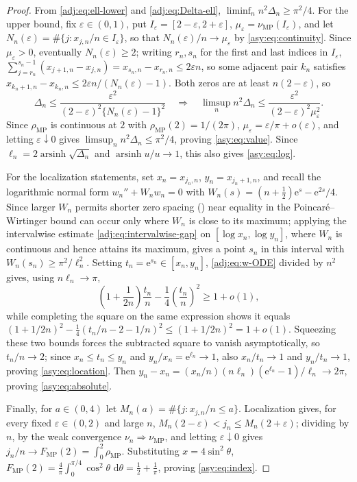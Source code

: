 \documentclass[11pt]{article}
\numberwithin{equation}{section}
\theoremstyle{definition}
\theoremstyle{remark}
\newcommand{\dd}{\,\mathrm d}
\newcommand{\e}{\mathrm e}
\newcommand{\MP}{\mathrm{MP}}
\begin{document}
\begin{proof}
From \eqref{adj:eq:ell-lower} and \eqref{adj:eq:Delta-ell}, $\liminf_n n^2\Delta_n\ge\pi^2/4$. For the upper bound, fix $\varepsilon\in(0,1)$, put $I_\varepsilon=[2-\varepsilon,2+\varepsilon]$, $\mu_\varepsilon=\nu_{\MP}(I_\varepsilon)$, and let $N_n(\varepsilon)=\#\{j:x_{j,n}/n\in I_\varepsilon\}$, so that $N_n(\varepsilon)/n\to\mu_\varepsilon$ by \eqref{asy:eq:continuity}. Since $\mu_\varepsilon>0$, eventually $N_n(\varepsilon)\ge2$; writing $r_n,s_n$ for the first and last indices in $I_\varepsilon$, $\sum_{j=r_n}^{s_n-1}(x_{j+1,n}-x_{j,n})=x_{s_n,n}-x_{r_n,n}\le2\varepsilon n$, so some adjacent pair $k_n$ satisfies $x_{k_n+1,n}-x_{k_n,n}\le2\varepsilon n/(N_n(\varepsilon)-1)$. Both zeros are at least $n(2-\varepsilon)$, so
\[
 \Delta_n
 \le
 \frac{\varepsilon^2}
 {(2-\varepsilon)^2\{N_n(\varepsilon)-1\}^2}
 \quad\Longrightarrow\quad
 \limsup_n n^2\Delta_n
 \le
 \frac{\varepsilon^2}{(2-\varepsilon)^2\mu_\varepsilon^2}.
\]
Since $\rho_{\MP}$ is continuous at $2$ with $\rho_{\MP}(2)=1/(2\pi)$, $\mu_\varepsilon=\varepsilon/\pi+o(\varepsilon)$, and letting $\varepsilon\downarrow0$ gives $\limsup_n n^2\Delta_n\le\pi^2/4$, proving \eqref{asy:eq:value}. Since $\ell_n=2\operatorname{arsinh}\sqrt{\Delta_n}$ and $\operatorname{arsinh}u/u\to1$, this also gives \eqref{asy:eq:log}.

For the localization statements, set $x_n=x_{j_n,n}$, $y_n=x_{j_n+1,n}$, and recall the logarithmic normal form $w_n''+W_nw_n=0$ with $W_n(s)=(n+\tfrac12)\e^s-\e^{2s}/4$. Since larger $W_n$ permits shorter zero spacing 
()
near equality in the Poincar\'e--Wirtinger bound can occur only where $W_n$ is close to its maximum; applying the intervalwise estimate \eqref{adj:eq:intervalwise-gap} on $[\log x_n,\log y_n]$, where $W_n$ is continuous and hence attains its maximum, gives a point $s_n$ in this interval with $W_n(s_n)\ge\pi^2/\ell_n^2$. Setting $t_n=\e^{s_n}\in[x_n,y_n]$, \eqref{adj:eq:w-ODE} divided by $n^2$ gives, using $n\ell_n\to\pi$,
\[
 \left(1+\frac1{2n}\right)\frac{t_n}{n}
 -
 \frac14\left(\frac{t_n}{n}\right)^2
 \ge1+o(1),
\]
while completing the square on the same expression shows it equals $(1+1/2n)^2-\tfrac14(t_n/n-2-1/n)^2\le(1+1/2n)^2=1+o(1)$. Squeezing these two bounds forces the subtracted square to vanish asymptotically, so $t_n/n\to2$; since $x_n\le t_n\le y_n$ and $y_n/x_n=\e^{\ell_n}\to1$, also $x_n/t_n\to1$ and $y_n/t_n\to1$, proving \eqref{asy:eq:location}. Then $y_n-x_n=(x_n/n)(n\ell_n)(\e^{\ell_n}-1)/\ell_n\to2\pi$, proving \eqref{asy:eq:absolute}.

Finally, for $a\in(0,4)$ let $M_n(a)=\#\{j:x_{j,n}/n\le a\}$. Localization gives, for every fixed $\varepsilon\in(0,2)$ and large $n$, $M_n(2-\varepsilon)<j_n\le M_n(2+\varepsilon)$; dividing by $n$, by the weak convergence $\nu_n\Rightarrow\nu_{\MP}$, and letting $\varepsilon\downarrow0$ gives $j_n/n\to F_{\MP}(2)=\int_0^2\rho_{\MP}$. Substituting $x=4\sin^2\theta$, $F_{\MP}(2)=\tfrac4\pi\int_0^{\pi/4}\cos^2\theta\,\dd\theta=\tfrac12+\tfrac1\pi$, proving \eqref{asy:eq:index}.
\end{proof}
\end{document}
